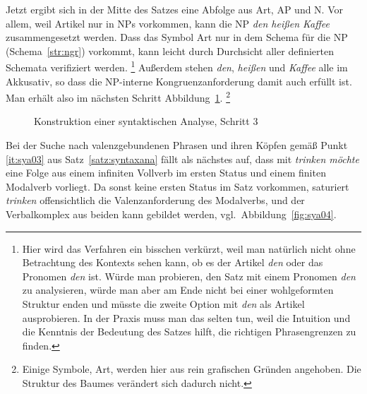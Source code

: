 Jetzt ergibt sich in der Mitte des Satzes eine Abfolge aus Art, AP und N.
Vor allem, weil Artikel nur in NPs vorkommen, kann die NP \textit{den heißen Kaffee} zusammengesetzt werden.
Dass das Symbol Art nur in dem Schema für die NP (Schema~\ref{str:ngr}) vorkommt, kann leicht durch Durchsicht aller definierten Schemata verifiziert werden.%
\footnote{Hier wird das Verfahren ein bisschen verkürzt, weil man natürlich nicht ohne Betrachtung des Kontexts sehen kann, ob es der Artikel \textit{den} oder das Pronomen \textit{den} ist.
Würde man probieren, den Satz mit einem Pronomen \textit{den} zu analysieren, würde man aber am Ende nicht bei einer wohlgeformten Struktur enden und müsste die zweite Option mit \textit{den} als Artikel ausprobieren.
In der Praxis muss man das selten tun, weil die Intuition und die Kenntnis der Bedeutung des Satzes hilft, die richtigen Phrasengrenzen zu finden.}
Außerdem stehen \textit{den}, \textit{heißen} und \textit{Kaffee} alle im Akkusativ, so dass die NP-interne Kongruenzanforderung damit  auch erfüllt ist.
Man erhält also im nächsten Schritt Abbildung~\ref{fig:sya03}.%
\footnote{Einige Symbole, \zB Art, werden hier aus rein grafischen Gründen angehoben.
Die Struktur des Baumes verändert sich dadurch nicht.}

\begin{figure}
  \caption{Konstruktion einer syntaktischen Analyse, Schritt 3}
  \label{fig:sya03}
\end{figure}

Bei der Suche nach valenzgebundenen Phrasen und ihren Köpfen gemäß Punkt \ref{it:sya03} aus Satz~\ref{satz:syntaxana} fällt als nächstes auf, dass mit \textit{trinken möchte} eine Folge aus einem infiniten Vollverb im ersten Status und einem finiten Modalverb vorliegt.
Da sonst keine ersten Status im Satz vorkommen, saturiert \textit{trinken} offensichtlich die Valenzanforderung des Modalverbs, und der Verbalkomplex aus beiden kann gebildet werden, vgl.\ Abbildung~\ref{fig:sya04}.

